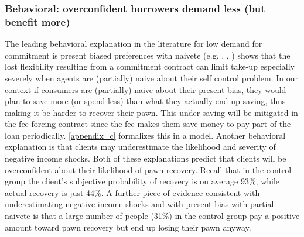 \documentclass[oneside,11pt]{article}
\begin{document}
\subsubsection{Behavioral: overconfident borrowers demand less (but benefit more)} \label{behavioral}

The leading behavioral explanation in the literature for low demand for commitment is present biased preferences with naivete (e.g. \cite{Rabin2018}, \cite{John}, \cite{Laibson2018})  \cite{Laibson2015} shows that the lost flexibility resulting from a commitment contract can limit take-up especially severely when agents are (partially) naive about their self control problem. In our context if consumers are (partially) naive about their present bias, they would plan to save more (or spend less) than what they actually end up saving, thus making it be harder to recover their pawn. This under-saving will be mitigated in the fee forcing contract since the fee makes them save money to pay part of the loan periodically. \ref{appendix_c} formalizes this in a model. Another behavioral explanation is that clients may underestimate the likelihood and severity of negative income shocks. Both of these explanations predict that clients will be overconfident about their likelihood of pawn recovery. Recall that in the control group the client's subjective probability of recovery is on average 93\%, while actual recovery is just 44\%. A further piece of evidence consistent with underestimating negative income shocks and with present bias with partial naivete is that a large number of people (31\%) in the control group pay a positive amount toward pawn recovery but end up losing their pawn anyway.
\end{document}
